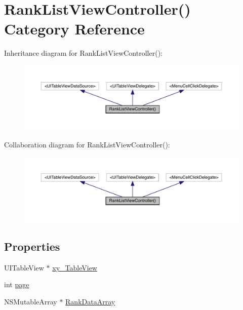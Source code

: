 \hypertarget{category_rank_list_view_controller_07_08}{}\section{Rank\+List\+View\+Controller() Category Reference}
\label{category_rank_list_view_controller_07_08}


Inheritance diagram for Rank\+List\+View\+Controller()\+:\nopagebreak
\begin{figure}[H]
\begin{center}
\leavevmode
\includegraphics[width=350pt]{category_rank_list_view_controller_07_08__inherit__graph}
\end{center}
\end{figure}


Collaboration diagram for Rank\+List\+View\+Controller()\+:\nopagebreak
\begin{figure}[H]
\begin{center}
\leavevmode
\includegraphics[width=350pt]{category_rank_list_view_controller_07_08__coll__graph}
\end{center}
\end{figure}
\subsection*{Properties}
\begin{DoxyCompactItemize}
\item 
U\+I\+Table\+View $\ast$ \mbox{\hyperlink{category_rank_list_view_controller_07_08_aa96ff8b4440066012637066ed2045e10}{xy\+\_\+\+Table\+View}}
\item 
int \mbox{\hyperlink{category_rank_list_view_controller_07_08_a5a4fb04b0369cf8d64342b2bcc2a5249}{page}}
\item 
N\+S\+Mutable\+Array $\ast$ \mbox{\hyperlink{category_rank_list_view_controller_07_08_a963396693c69a2541d580b2460f60258}{Rank\+Data\+Array}}
\end{DoxyCompactItemize}


